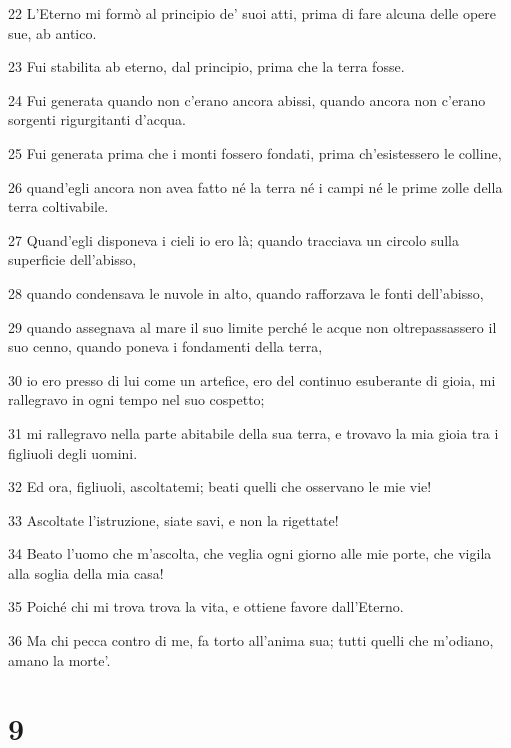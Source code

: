 \par 22 L'Eterno mi formò al principio de' suoi atti, prima di fare alcuna delle opere sue, ab antico.
\par 23 Fui stabilita ab eterno, dal principio, prima che la terra fosse.
\par 24 Fui generata quando non c'erano ancora abissi, quando ancora non c'erano sorgenti rigurgitanti d'acqua.
\par 25 Fui generata prima che i monti fossero fondati, prima ch'esistessero le colline,
\par 26 quand'egli ancora non avea fatto né la terra né i campi né le prime zolle della terra coltivabile.
\par 27 Quand'egli disponeva i cieli io ero là; quando tracciava un circolo sulla superficie dell'abisso,
\par 28 quando condensava le nuvole in alto, quando rafforzava le fonti dell'abisso,
\par 29 quando assegnava al mare il suo limite perché le acque non oltrepassassero il suo cenno, quando poneva i fondamenti della terra,
\par 30 io ero presso di lui come un artefice, ero del continuo esuberante di gioia, mi rallegravo in ogni tempo nel suo cospetto;
\par 31 mi rallegravo nella parte abitabile della sua terra, e trovavo la mia gioia tra i figliuoli degli uomini.
\par 32 Ed ora, figliuoli, ascoltatemi; beati quelli che osservano le mie vie!
\par 33 Ascoltate l'istruzione, siate savi, e non la rigettate!
\par 34 Beato l'uomo che m'ascolta, che veglia ogni giorno alle mie porte, che vigila alla soglia della mia casa!
\par 35 Poiché chi mi trova trova la vita, e ottiene favore dall'Eterno.
\par 36 Ma chi pecca contro di me, fa torto all'anima sua; tutti quelli che m'odiano, amano la morte'.

\chapter{9}

